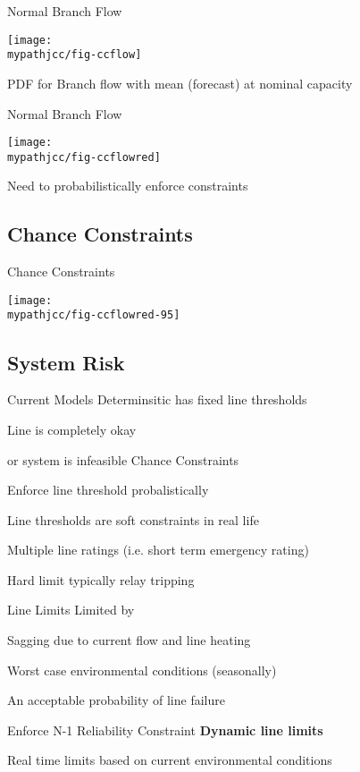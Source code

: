 \begin{frame}{Normal Branch Flow}
\begin{center}
\texttt{[image: \\mypathjcc/fig-ccflow]}
\end{center}
PDF for Branch flow with mean (forecast) at nominal capacity
\end{frame}


\begin{frame}{Normal Branch Flow}
\begin{center}
\texttt{[image: \\mypathjcc/fig-ccflowred]}
\end{center}

\alert{Need to probabilistically enforce constraints}

\end{frame}


\subsection{Chance Constraints}
\begin{frame}{Chance Constraints}

\begin{center}
\texttt{[image: \\mypathjcc/fig-ccflowred-95]}
\end{center}


\end{frame}

\subsection{System Risk}
\begin{frame}{Current Models}
Determinsitic has fixed line thresholds
\bi
\item Line is completely okay
\item or system is infeasible
\ei
\pause
Chance Constraints
\bi
\item Enforce line threshold probalistically
\ei
\pause

\alert{Line thresholds are soft constraints in real life}
\pause
\bi
\item Multiple line ratings (i.e. short term emergency rating)
\item Hard limit typically relay tripping
\ei
\end{frame}

\begin{frame}{Line Limits}
Limited by
\bi
\item Sagging due to current flow and line heating
\item \alert<2>{Worst case environmental conditions (seasonally)}
\item An acceptable probability of line failure
\item Enforce N-1 Reliability Constraint
\ei
\bigskip
\pause
\textbf{Dynamic line limits}
\bi
\item Real time limits based on current environmental conditions
\ei

\end{frame}

